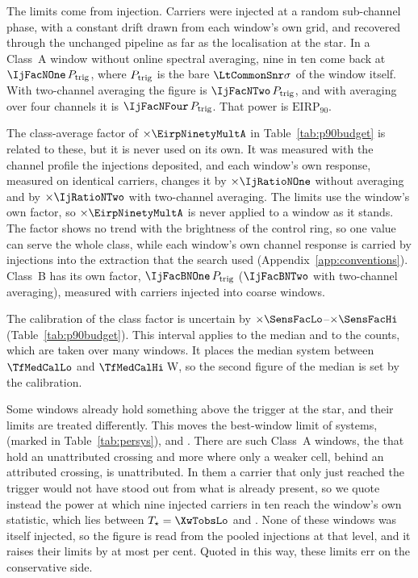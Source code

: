 The limits come from injection. Carriers were injected at a random
sub-channel phase, with a constant drift drawn from each window's own grid, and
recovered through the unchanged pipeline as far as the localisation at the
star. In a Class~A window without online spectral averaging, nine in ten
come back at $\IjFacNOne\,P_{\rm trig}$, where $P_{\rm trig}$ is the bare
$\LtCommonSnr\sigma$ of the window itself. With two-channel averaging the
figure is $\IjFacNTwo\,P_{\rm trig}$, and with averaging over four channels
it is $\IjFacNFour\,P_{\rm trig}$. That power is $\mathrm{EIRP}_{90}$.

The class-average factor of $\times\EirpNinetyMultA$ in
Table~\ref{tab:p90budget} is related to these, but it is never used on
its own. It was measured with the channel profile the injections deposited,
and each window's own response, measured on identical carriers, changes it
by $\times\IjRatioNOne$ without averaging and by $\times\IjRatioNTwo$ with
two-channel averaging. The limits use the window's own factor, so
$\times\EirpNinetyMultA$ is never applied to a window as it stands. The
factor shows no trend with the brightness of the control ring, so one value
can serve the whole class, while each window's own channel response is
carried by injections into the extraction that the search used
(Appendix~\ref{app:conventions}). Class~B has its own factor,
$\IjFacBNOne\,P_{\rm trig}$ ($\IjFacBNTwo$ with two-channel averaging),
measured with \SensNToneCoarse{} carriers injected into \SensNInjCoarse{}
coarse windows.

The calibration of the class factor is uncertain by
$\times\SensFacLo$--$\times\SensFacHi$ (Table~\ref{tab:p90budget}). This
interval applies to the median and to the counts, which are taken over
many windows. It places the median system between $\TfMedCalLo$ and
$\TfMedCalHi$\,W, so the second figure of the median is set by the
calibration.

Some windows already hold something above the trigger at the star, and
their limits are treated differently. This moves the best-window limit of
\XwNSysWord{} systems, \XwSysNames{} (marked \XwMark{} in
Table~\ref{tab:persys}), and \XwHeadlineClause. There are \XwNWin{} such Class~A windows, the \CeObs{}
that hold an unattributed crossing and \XwNWinSecWord{} more where only a
weaker cell, behind an attributed crossing, is unattributed. In them a
carrier that only just reached the trigger would not have stood out from
what is already present, so we quote instead the power at which nine
injected carriers in ten reach the window's own statistic, which lies
between $T_\star=\XwTobsLo$ and \XwTobsHi. None of these windows was itself
injected, so the figure is read from the pooled injections at that level,
and it raises their limits by at most \XwFacMaxPct{} per cent. Quoted in
this way, these limits err on the conservative side.

